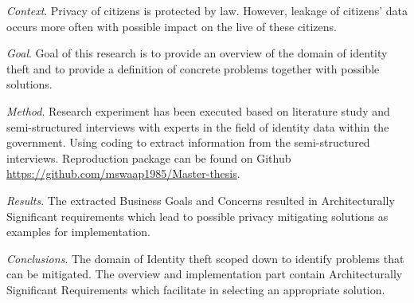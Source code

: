 


\begin{abstracts}        %

\noindent \textit{Context}. 
Privacy of citizens is protected by law. However, leakage of citizens' data occurs more often with possible impact on the live of these citizens.

\noindent \textit{Goal}. 
Goal of this research is to provide an overview of the domain of identity theft and to provide a definition of concrete problems together with possible solutions.

\noindent \textit{Method}. 
Research experiment has been executed based on literature study and semi-structured interviews with experts in the field of identity data within the government. 
Using coding to extract information from the semi-structured interviews. Reproduction package can be found on Github \url{https://github.com/mswaap1985/Master-thesis}.

\noindent \textit{Results}. 
The extracted Business Goals and Concerns resulted in Architecturally Significant requirements which lead to possible privacy mitigating solutions as examples for implementation.

\noindent \textit{Conclusions}. 
The domain of Identity theft scoped down to identify problems that can be mitigated. The overview and implementation part contain Architecturally Significant Requirements which facilitate in selecting an appropriate solution. 

\end{abstracts}


